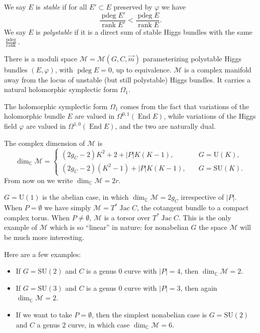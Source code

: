 \documentclass[12pt,letterpaper,reqno]{article}
\numberwithin{equation}{section}
\newcommand{\cM}{\ensuremath{\mathcal M}}
\newcommand{\C}{\ensuremath{\mathbb C}}
\newcommand{\abs}[1]{\lvert#1\rvert}
\newcommand{\ti}[1]{\textit{#1}}
\DeclareMathOperator{\End}{End}
\DeclareMathOperator{\rank}{rank}
\DeclareMathOperator{\Jac}{Jac}
\DeclareMathOperator{\pdeg}{pdeg}
\newcommand{\SU}{\mathrm{SU}}
\newcommand{\U}{\mathrm{U}}
\newcommand{\fixme}[1]{{\color{orange}{[#1]}}}
\begin{document}
\begin{defn}
We say $E$ is \ti{stable} if for all $E' \subset E$ preserved
by $\varphi$ we have
\begin{equation}
  \frac{\pdeg E'}{\rank E'} < \frac{\pdeg E}{\rank E}.
\end{equation}
We say $E$ is \ti{polystable} if it is a direct sum of
stable Higgs bundles with the same $\frac{\pdeg}{\rank}$.
\end{defn}

\begin{prop}
There is a moduli space $\cM = \cM(G,C,\vec{m})$ parameterizing
polystable Higgs bundles $(E,\varphi)$, with $\pdeg E = 0$, 
up to equivalence. 
$\cM$ is a complex manifold away
from the locus of unstable (but still polystable) Higgs bundles.
It carries a natural holomorphic symplectic form $\Omega_1$.
\end{prop}


The holomorphic symplectic form 
$\Omega_1$ comes from the fact that variations of the
holomorphic bundle $E$ are valued in $\Omega^{0,1}(\End E)$,
while variations of the Higgs field $\varphi$ are
valued in $\Omega^{1,0}(\End E)$,
and the two are naturally dual. \fixme{with some care
around punctures}

\begin{remark}[Dimension of $\cM$]
The complex dimension of $\cM$ is
\begin{equation} \label{eq:dim-M}
  \dim_\C \cM = \begin{cases} (2g_C-2) K^2 + 2 + \abs{P} K(K-1), & \quad G = \U(K), \\ (2g_C-2) (K^2-1) + \abs{P} K(K-1), & \quad G = \SU(K). \end{cases}
\end{equation}
From now on we write $\dim_\C \cM = 2r$.
\end{remark}

\begin{example}
$G = \U(1)$ is the abelian case, in which $\dim_\C \cM = 2g_C$ irrespective
of $\abs{P}$. When $P = \emptyset$ we have simply $\cM = T^* \Jac C$, the cotangent
bundle to a compact complex torus. When $P \neq \emptyset$, $\cM$ is a torsor
over $T^* \Jac C$.
This is the only example of $\cM$ which is so ``linear'' in nature:
for nonabelian $G$ the space $\cM$ will be much more interesting.
\end{example}

\begin{example} Here are a few examples:
\begin{itemize}
\item If $G = \SU(2)$ and $C$ is a genus $0$ curve with $\abs{P} = 4$,
then $\dim_\C \cM = 2$.
\item If $G = \SU(3)$
and $C$ is a genus $0$ curve with $\abs{P}=3$,
then again $\dim_\C \cM = 2$.
\item If we want to take $P = \emptyset$,
then the simplest nonabelian case is
$G = \SU(2)$ and $C$ a genus $2$ curve, in which case
$\dim_\C \cM = 6$. 
\end{itemize}
\end{example}
\end{document}

